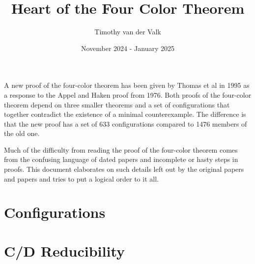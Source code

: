 \documentclass{article}
\title{Heart of the Four Color Theorem}
\author{Timothy van der Valk}
\date{November 2024 - January 2025}
\begin{document}
\maketitle

A new proof of the four-color theorem has been given by Thomas et al \cite{thomas} in 1995 as a response to the Appel and Haken proof from 1976. Both proofs of the four-color theorem depend on three smaller theorems and a set of configurations that together contradict the existence of a minimal counterexample. The difference is that the new proof has a set of 633 configurations compared to 1476 members of the old one.

Much of the difficulty from reading the proof of the four-color theorem comes from the confusing language of dated papers and incomplete or hasty steps in proofs. This document elaborates on such details left out by the original papers and papers and tries to put a logical order to it all.


\tableofcontents

\pagebreak




\section{Configurations}
\label{sec:config}

\section{C/D Reducibility}
\label{sec:reduce}

\pagebreak
\printbibliography
\end{document}
